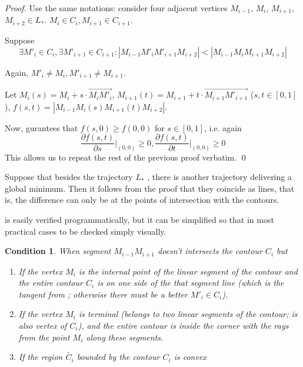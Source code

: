 \documentclass[]{llncs}
\newtheorem{condition}{Condition}
\begin{document}
\begin{proof}
Use the same notations:
consider four adjacent vertices
$M_{i-1}$, $M_i$, $M_{i+1}$, $M_{i+2} \in L_*$.
$M_i \in  C_i,
M_{i+1} \in C_{i+1}$.

Suppose
$$
\exists M'_i \in C_i,
\exists M'_{i+1} \in C_{i+1}
:
|M_{i-1} M'_i M'_{i+1} M_{i+2}|
<
|M_{i-1} M_i M_{i+1} M_{i+2}|
$$

Again,
$
M'_i \ne M_i,
M'_{i+1} \ne M_{i+1}
$.

Let
$
M_i(s)=M_i+s \cdot \overrightarrow{M_i M'_i}
$,
$
 M_{i+1}(t)= M_{i+1}+t \cdot \overrightarrow{M_{i+1} M'_{i+1}}
$
($s,t \in[0,1]$),
$f(s,t)=
|M_{i-1} M_i(s) M_{i+1}(t) M_{i+2}|
$.

Now,
gurantees that
$f(s,0)\ge f(0,0)$
for
$s\in[0,1]$,
i.e. again
\begin{equation}
  \frac{\partial f(s,t)}{\partial s} \Big|_{(0,0)} \ge 0,
  \frac{\partial f(s,t)}{\partial t} \Big|_{(0,0)} \ge 0
\end{equation}
This allows us to repeat the rest of the previous proof verbatim.
\qed
\end{proof}

\begin{remark}
Suppose that besides the trajectory
$L_*$ ,
there is another trajectory delivering a global minimum.
Then it follows from the proof
that they coincide as lines,
that is,
the difference can only be at
the points of intersection with the contours.
\end{remark}

is easily verified programmatically,
but it can be simplified
so that in most practical cases
to be checked simply visually.

\begin{condition}
When segment
$M_{i-1} M_{i+1}$
doesn't intersects the contour
$C_i$ but
\begin{enumerate}
  \item
  If the vertex
  $M_i$
  is the internal point of the linear segment of the contour
  and the entire contour
  $C_i$
  is on one side of the that segment line
  (which is the tangent from ;
  otherwise there must be a better
  $M'_i\in C_i$).
  \item
  If the vertex
  $M_i$ is terminal
  (belongs to two linear segments of the contour;
  is also vertex of $C_i$),
  and the entire contour is inside
  the corner with the rays from the point
  $M_i$ along these segments.
  \item
  If the region
  $\tilde{C_i}$
  bounded by the contour
  $C_i$ is convex
\end{enumerate}
\end{condition}
\end{document}
